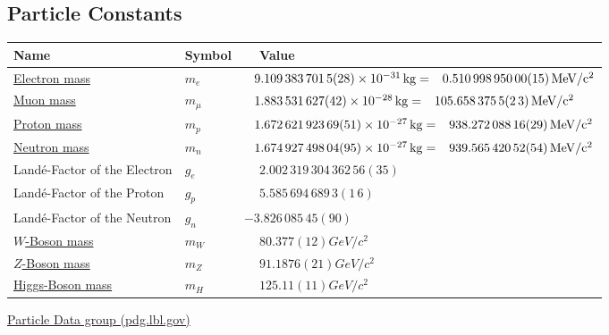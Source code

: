	\subsection{Particle Constants}
		\label{Sec:ParticleConstants}
		\begin{center}
			\begin{tabular}{| L{.35\textwidth} L{.15\textwidth} L{.4\textwidth} |}
				\hline Name & Symbol & $\phantom{-}$Value \\ \hline \hline
				\href{https://en.wikipedia.org/wiki/Electron_mass}{Electron mass} & $m_e$ & 
				$\phantom{-}9.109\,383\,701\,5(28)\times 10^{-31}\,\mathrm{kg} = 
				\phantom{-}0.510\,998\,950\,00(15)\,\mathrm{MeV/c^2}$ \\ \hline
				\href{https://en.wikipedia.org/wiki/Muon}{Muon mass} & $m_\mu$ & 
				$\phantom{-}1.883\,531\,627(42)\times 10^{-28}\,\mathrm{kg} = 
				\phantom{-}105.658\,375\,5(2\,3)\,\mathrm{MeV/c^2}$ \\ \hline
				\href{https://en.wikipedia.org/wiki/Proton}{Proton mass} & $m_p$ & 
				$\phantom{-}1.672\,621\,923\,69(51)\times 10^{-27}\,\mathrm{kg} = 
				\phantom{-}938.272\,088\,16(29)\,\mathrm{MeV/c^2}$ \\ \hline
				\href{https://en.wikipedia.org/wiki/Neutron}{Neutron mass} & $m_n$ & 
				$\phantom{-}1.674\,927\,498\, 04(95)\times 10^{-27}\,\mathrm{kg} = 
				\phantom{-}939.565\,420\,52(54)\,\mathrm{MeV/c^2}$ \\ \hline
				Landé-Factor of the Electron & $g_e$ & 
				$\phantom{-}2.002\,319\,304\,362\,56(35)$ \\ \hline
				Landé-Factor of the Proton & $g_p$ & 
				$\phantom{-}5.585\,694\,689\,3(1\,6)$ \\ \hline
				Landé-Factor of the Neutron & $g_n$ & 
				$- 3.826\,085\,45(90)$ \\ \hline
				\href{https://en.wikipedia.org/wiki/W_and_Z_bosons#W_bosons}{$W$-Boson mass} & $m_W$ & 
				$\phantom{-}80.377(12)\unit{GeV/c^2}$ \\ \hline
				\href{https://en.wikipedia.org/wiki/W_and_Z_bosons#W_bosons}{$Z$-Boson mass} & $m_Z$ & 
				$\phantom{-}91.1876(21)\unit{GeV/c^2}$ \\ \hline
				\href{https://en.wikipedia.org/wiki/Higgs_boson}{Higgs-Boson mass} & $m_H$ & 
				$\phantom{-}125.11(11)\unit{GeV/c^2}$ \\ \hline
			\end{tabular}
		\end{center}

		\href{https://pdg.lbl.gov/}{Particle Data group (pdg.lbl.gov)}


